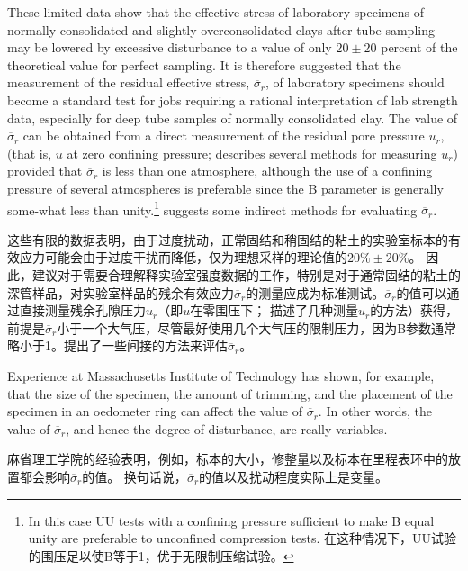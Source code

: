 


\begin{paracol}{2}
    
    These limited data show that the effective stress of laboratory specimens of normally consolidated and slightly overconsolidated clays after tube sampling may be lowered by excessive disturbance to a value of only $20\pm20$ percent of the theoretical value for perfect sampling. It is therefore suggested that the measurement of the residual effective stress, $\overline{\sigma}_r$, of laboratory specimens should become a standard test for jobs requiring a rational interpretation of lab strength data, especially for deep tube samples of normally consolidated clay. The value of $\overline{\sigma}_r$ can be obtained from a direct measurement of the residual pore pressure $u_r$, (that is, $u$ at zero confining pressure; \cite{Lambe1961207} describes several methods for measuring $u_r$) provided that $\overline{\sigma}_r$ is less than one atmosphere, although the use of a confining pressure of several atmospheres is preferable since the B parameter is generally some-what less than unity.\footnote{
        In this case UU tests with a confining pressure sufficient to make B equal unity are preferable to unconfined compression tests. 在这种情况下，UU试验的围压足以使B等于1，优于无限制压缩试验。
    } \citet{Skempton1961351} suggests some indirect methods for evaluating $\overline{\sigma}_r$.

    \switchcolumn

    这些有限的数据表明，由于过度扰动，正常固结和稍固结的粘土的实验室标本的有效应力可能会由于过度干扰而降低，仅为理想采样的理论值的$20\%\pm{}20\%$。 因此，建议对于需要合理解释实验室强度数据的工作，特别是对于通常固结的粘土的深管样品，对实验室样品的残余有效应力$\overline{\sigma}_r$的测量应成为标准测试。$\overline{\sigma}_r$的值可以通过直接测量残余孔隙压力$u_r$（即$u$在零围压下； \cite{Lambe1961207}描述了几种测量$u_r$的方法）获得，前提是$\overline{\sigma}_r$小于一个大气压，尽管最好使用几个大气压的限制压力，因为B参数通常略小于1。\citet{Skempton1961351}提出了一些间接的方法来评估$\overline{\sigma}_r$。

    \switchcolumn*

    Experience at Massachusetts Institute of Technology has shown, for example, that the size of the specimen, the amount of trimming, and the placement of the specimen in an oedometer ring can affect the value of $\overline{\sigma}_r$. In other words, the value of $\overline{\sigma}_r$, and hence the degree of disturbance, are really variables.

    \switchcolumn

    麻省理工学院的经验表明，例如，标本的大小，修整量以及标本在里程表环中的放置都会影响$\overline{\sigma}_r$的值。 换句话说，$\overline{\sigma}_r$的值以及扰动程度实际上是变量。

\end{paracol}